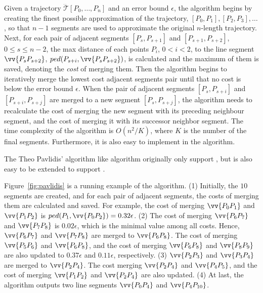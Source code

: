 Given a trajectory $\dddot{\mathcal{T}}[P_0, \ldots, P_n]$ and an error bound $\epsilon$,
the algorithm begins by creating the finest possible approximation of the trajectory, \ie $[P_0, P_1], [P_2, P_3], \ldots$, so that $n-1$ segments are used to approximate the original $n$-length trajectory.
Next, for each pair of adjacent segments $[P_{s}, P_{s+1}]$ and $[P_{s+1}, P_{s+2}]$, $0\le s \le n-2$,
the max distance of each points $P_i$, $0<i<2$, to the line segment $\vv{P_sP_{s+2}}$, \ie $ped(P_{s+i}, \vv{P_sP_{s+2}})$, is calculated and the maximum of them is saved, denoting the \emph{cost} of merging them.
Then the algorithm begins to iteratively merge the lowest cost adjacent segments pair
until that no cost is below the error bound $\epsilon$.
When the pair of adjacent segments $[P_{s}, P_{s+i}]$ and $[P_{s+i}, P_{s+j}]$ are merged to a new segment $[P_{s}, P_{s+j}]$, the algorithm needs to recalculate the cost of merging the new segment with its preceding neighbour segment, and the cost of merging it with its successor neighbor segment.
The time complexity of the algorithm is $O(n^2/K)$, where $K$ is the number of the final segments.
Furthermore, it is also easy to implement \sed in the \pavlidis algorithm.


The Theo Pavlidis' algorithm like \dpa algorithm originally only support \ped, but is also easy to be extended to support \sed.


\begin{example}
\label{exm-alg-squishe}
Figure~\ref{fig:pavlidis} is a running example of the \pavlidis algorithm.
(1) Initially, the $10$ segments are created, and for each pair of adjacent segments, the costs of merging them are calculated and saved. For example, the cost of merging $\vv{P_0P_1}$ and $\vv{P_1P_2}$ is $ped(P_{1}, \vv{P_0P_{2}}) = 0.32\epsilon$.
(2) The cost of merging $\vv{P_6P_7}$ and $\vv{P_7P_8}$ is $0.02\epsilon$, which is the minimal value among all costs. Hence, $\vv{P_6P_7}$ and $\vv{P_7P_8}$ are merged to $\vv{P_6P_8}$. The cost of merging $\vv{P_5P_6}$ and $\vv{P_6P_8}$, and the cost of merging $\vv{P_6P_8}$ and $\vv{P_8P_9}$ are also updated to $0.37\epsilon$ and $0.11\epsilon$, respectively.
(3) $\vv{P_2P_3}$ and $\vv{P_3P_4}$ are merged to $\vv{P_2P_4}$. The cost merging $\vv{P_2P_4}$ and $\vv{P_4P_5}$, and the cost of merging $\vv{P_1P_2}$ and $\vv{P_2P_4}$ are also updated.
(4) At last, the algorithm outputs two line segments $\vv{P_0P_4}$ and $\vv{P_4P_{10}}$.
\end{example}

